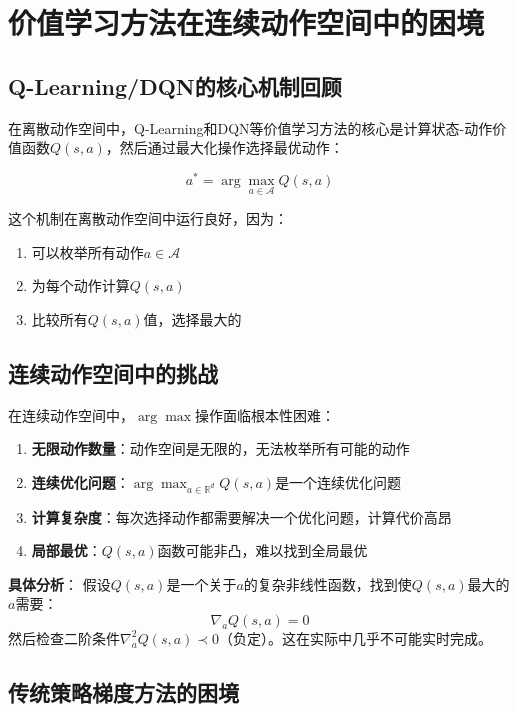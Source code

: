 \section{价值学习方法在连续动作空间中的困境}

\subsection{Q-Learning/DQN的核心机制回顾}

在离散动作空间中，Q-Learning和DQN等价值学习方法的核心是计算状态-动作价值函数$Q(s,a)$，然后通过最大化操作选择最优动作：

\[
a^* = \arg\max_{a \in \mathcal{A}} Q(s,a)
\]

这个机制在离散动作空间中运行良好，因为：
\begin{enumerate}
    \item 可以枚举所有动作$a \in \mathcal{A}$
    \item 为每个动作计算$Q(s,a)$
    \item 比较所有$Q(s,a)$值，选择最大的
\end{enumerate}

\subsection{连续动作空间中的挑战}

在连续动作空间中，$\arg\max$操作面临根本性困难：

\begin{enumerate}
    \item \textbf{无限动作数量}：动作空间是无限的，无法枚举所有可能的动作
    \item \textbf{连续优化问题}：$\arg\max_{a \in \mathbb{R}^d} Q(s,a)$是一个连续优化问题
    \item \textbf{计算复杂度}：每次选择动作都需要解决一个优化问题，计算代价高昂
    \item \textbf{局部最优}：$Q(s,a)$函数可能非凸，难以找到全局最优
\end{enumerate}

\textbf{具体分析}：
假设$Q(s,a)$是一个关于$a$的复杂非线性函数，找到使$Q(s,a)$最大的$a$需要：
\[
\nabla_a Q(s,a) = 0
\]
然后检查二阶条件$\nabla_a^2 Q(s,a) \prec 0$（负定）。这在实际中几乎不可能实时完成。

\subsection{传统策略梯度方法的困境}


